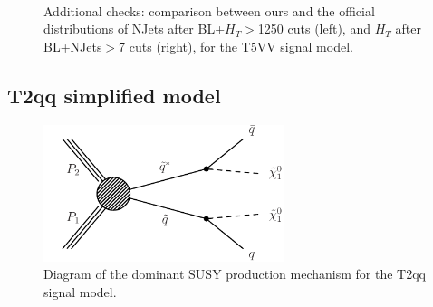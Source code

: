         \begin{figure}
        \centering
        \hspace{-1 cm}
        ~ %
        \caption{Additional checks: comparison between ours and the official distributions of NJets after BL+$H_T$$>$1250 cuts (left), and $H_T$ after BL+NJets$>$7 cuts (right), for the T5VV signal model.}
        \end{figure}   
        

\clearpage
\subsection{T2qq simplified model}

\begin{figure}[h!]
\centering
\includegraphics[width=7cm]{figures/Appendices/Ma5ValidationSUS13012/T2qq.pdf}
\caption{Diagram of the dominant SUSY production mechanism
for the T2qq signal model.}
\label{fig:T2qq}
\end{figure}

